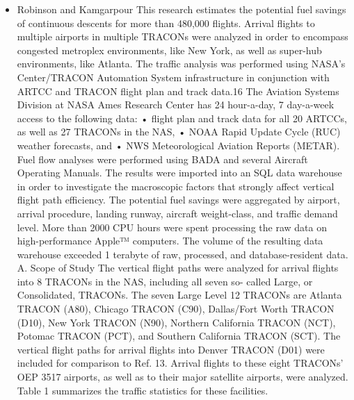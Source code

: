 \documentclass{aer1315-pretty}
\begin{document}
\begin{itemize}
\item Robinson and Kamgarpour \cite{Rob:2010} 
    This research estimates the potential fuel savings of continuous descents for more than 480,000 flights. Arrival
flights to multiple airports in multiple TRACONs were analyzed in order to encompass congested metroplex
environments, like New York, as well as super-hub environments, like Atlanta. The traffic analysis was performed
using NASA’s Center/TRACON Automation System infrastructure in conjunction with ARTCC and TRACON
flight plan and track data.16 The Aviation Systems Division at NASA Ames Research Center has 24 hour-a-day, 7
day-a-week access to the following data:
    • flight plan and track data for all 20 ARTCCs, as well as 27 TRACONs in the NAS,
    • NOAA Rapid Update Cycle (RUC) weather forecasts, and
    • NWS Meteorological Aviation Reports (METAR).
    Fuel flow analyses were performed using BADA and several Aircraft Operating Manuals. The results were
imported into an SQL data warehouse in order to investigate the macroscopic factors that strongly affect vertical
flight path efficiency. The potential fuel savings were aggregated by airport, arrival procedure, landing runway,
aircraft weight-class, and traffic demand level. More than 2000 CPU hours were spent processing the raw data on
high-performance Apple™ computers. The volume of the resulting data warehouse exceeded 1 terabyte of raw,
processed, and database-resident data.
A. Scope of Study
    The vertical flight paths were analyzed for arrival flights into 8 TRACONs in the NAS, including all seven so-
called Large, or Consolidated, TRACONs. The seven Large Level 12 TRACONs are Atlanta TRACON (A80),
Chicago TRACON (C90), Dallas/Fort Worth TRACON (D10), New York TRACON (N90), Northern California
TRACON (NCT), Potomac TRACON (PCT), and Southern California TRACON (SCT). The vertical flight paths
for arrival flights into Denver TRACON (D01) were included for comparison to Ref. 13. Arrival flights to these
eight TRACONs’ OEP 3517 airports, as well as to their major satellite airports, were analyzed. Table 1 summarizes
the traffic statistics for these facilities.




\end{itemize}
\end{document}
